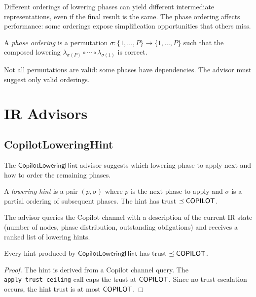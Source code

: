 \documentclass[11pt]{article}
\newcommand{\LowHint}{\mathsf{CopilotLoweringHint}}
\begin{document}
Different orderings of lowering phases can yield different
intermediate representations, even if the final result is
the same.  The phase ordering affects performance:
some orderings expose simplification opportunities that
others miss.

\begin{definition}\label{def:phaseord}
A \emph{phase ordering} is a permutation
$\sigma \colon \{1, \ldots, P\} \to \{1, \ldots, P\}$
such that the composed lowering
$\lambda_{\sigma(P)} \circ \cdots \circ \lambda_{\sigma(1)}$
is correct.
\end{definition}

\begin{remark}
Not all permutations are valid: some phases have dependencies.
The advisor must suggest only valid orderings.
\end{remark}

\section{IR Advisors}\label{sec:advisors}

\subsection{CopilotLoweringHint}

The $\LowHint$ advisor suggests which lowering phase to
apply next and how to order the remaining phases.

\begin{definition}\label{def:lowhint}
A \emph{lowering hint} is a pair $(p, \sigma)$ where $p$
is the next phase to apply and $\sigma$ is a partial
ordering of subsequent phases.  The hint has trust
$\preceq \mathsf{COPILOT}$.
\end{definition}

The advisor queries the Copilot channel with a description
of the current IR state (number of nodes, phase distribution,
outstanding obligations) and receives a ranked list of
lowering hints.

\begin{lemma}\label{lem:lowhintceil}
Every hint produced by $\LowHint$ has trust $\preceq \mathsf{COPILOT}$.
\end{lemma}
\begin{proof}
The hint is derived from a Copilot channel query.  The
\texttt{apply\_trust\_ceiling} call caps the trust at
$\mathsf{COPILOT}$.  Since no trust escalation occurs, the hint
trust is at most $\mathsf{COPILOT}$.
\end{proof}
\end{document}
